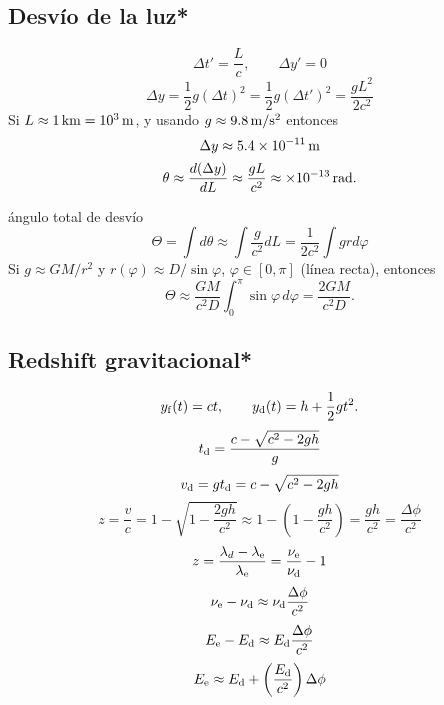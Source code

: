 \subsection{Desvío de la luz*}
\begin{equation}
\Delta t'=\frac{L}{c}, \qquad \Delta y' = 0
\end{equation}
\begin{equation}
\Delta y = \frac{1}{2} g (\Delta t)^2 = \frac{1}{2} g (\Delta t')^2 = \frac{gL^2}{2c^2}
\end{equation}
Si $L\approx 1{\,\rm km} = 10^3{\,\rm m}$, y usando $g\approx 9.8{\,\rm m/s^2}$ entonces
\begin{equation}
\Delta y \approx 5.4\times 10^{-11}{\,\rm m}
\end{equation}
\begin{equation}
\theta \approx \frac{d(\Delta y)}{dL} \approx \frac{gL}{c^2} \approx \times 10^{-13}{\,\rm rad}.
\end{equation}

ángulo total de desvío
\begin{equation}
\Theta = \int d\theta \approx \int \frac{g}{c^2}dL = \frac{1}{2c^2}\int g r d\varphi
\end{equation}
Si $g\approx GM/r^2$ y $r(\varphi)\approx D/\sin\varphi$, $\varphi\in [0,\pi]$ (línea recta), entonces
\begin{equation}
\Theta \approx \frac{GM}{c^2D}\int_0^\pi\sin\varphi\,d\varphi = \frac{2GM}{c^2D}.
\end{equation}

\subsection{Redshift gravitacional*}
 
 \begin{equation}
 y_{\rm f}(t) = ct, \qquad y_{\rm d}(t)=h+\frac{1}{2}gt^2.
 \end{equation}
 \begin{equation}
t_{\rm d} = \frac{c-\sqrt{c^2-2gh}}{g}
 \end{equation}
 \begin{equation}
 v_{\rm d}=gt_{\rm d} = c-\sqrt{c^2-2gh}
 \end{equation}
 \begin{equation}
 z=\frac{v}{c}=1-\sqrt{1-\frac{2gh}{c^2}} \approx 1-\left(1-\frac{gh}{c^2}\right) = \frac{gh}{c^2} = \frac{\Delta\phi}{c^2}
 \end{equation}
 \begin{equation}
z = \frac{\lambda_{d}-\lambda_{\rm e}}{\lambda_{\rm e}} = \frac{\nu_{\rm e}}{\nu_{\rm d}}-1
 \end{equation}
 \begin{equation}
 \nu_{\rm e}-\nu_{\rm d} \approx \nu_{\rm d}\frac{\Delta\phi}{c^2}
 \end{equation}
  \begin{equation}
 E_{\rm e}-E_{\rm d} \approx E_{\rm d}\frac{\Delta\phi}{c^2}
 \end{equation}
   \begin{equation}
 E_{\rm e} \approx E_{\rm d} + \left(\frac{E_{\rm d}}{c^2}\right)\Delta\phi
 \end{equation}
